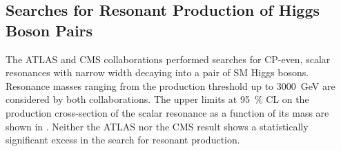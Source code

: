 \subsection*{Searches for Resonant Production of Higgs Boson Pairs}%
\label{sec:past_results_resonant}

The ATLAS and CMS collaborations performed searches for CP-even, scalar
resonances with narrow width decaying into a pair of SM Higgs bosons. Resonance
masses ranging from the \HH production threshold up to \SI{3000}{\GeV} are
considered by both collaborations. The upper limits at \SI{95}{\percent} CL on
the production cross-section of the scalar resonance as a function of its mass
are shown in . Neither the ATLAS nor the CMS result
shows a statistically significant excess in the search for resonant \HH
production.

